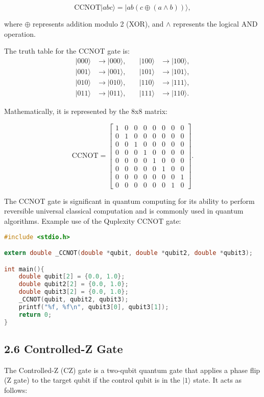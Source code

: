\documentclass{article}
\begin{document}
\[
\text{CCNOT}|abc\rangle = |ab(c \oplus (a \land b))\rangle,
\]

where \(\oplus\) represents addition modulo 2 (XOR), and \(\land\) represents the logical AND operation.

The truth table for the CCNOT gate is:
\[
\begin{aligned}
|000\rangle & \to |000\rangle, \quad & |100\rangle & \to |100\rangle, \\
|001\rangle & \to |001\rangle, \quad & |101\rangle & \to |101\rangle, \\
|010\rangle & \to |010\rangle, \quad & |110\rangle & \to |111\rangle, \\
|011\rangle & \to |011\rangle, \quad & |111\rangle & \to |110\rangle.
\end{aligned}
\]

Mathematically, it is represented by the 8x8 matrix:

\[
\text{CCNOT} = \begin{bmatrix}
1 & 0 & 0 & 0 & 0 & 0 & 0 & 0 \\
0 & 1 & 0 & 0 & 0 & 0 & 0 & 0 \\
0 & 0 & 1 & 0 & 0 & 0 & 0 & 0 \\
0 & 0 & 0 & 1 & 0 & 0 & 0 & 0 \\
0 & 0 & 0 & 0 & 1 & 0 & 0 & 0 \\
0 & 0 & 0 & 0 & 0 & 1 & 0 & 0 \\
0 & 0 & 0 & 0 & 0 & 0 & 0 & 1 \\
0 & 0 & 0 & 0 & 0 & 0 & 1 & 0
\end{bmatrix}.
\]

The CCNOT gate is significant in quantum computing for its ability to perform reversible universal classical computation and is commonly used in quantum algorithms.
Example use of the Quplexity CCNOT gate:

\begin{lstlisting}[language=C, frame=single]
#include <stdio.h>

extern double _CCNOT(double *qubit, double *qubit2, double *qubit3);

int main(){
    double qubit[2] = {0.0, 1.0};
    double qubit2[2] = {0.0, 1.0};
    double qubit3[2] = {0.0, 1.0};
    _CCNOT(qubit, qubit2, qubit3);
    printf("%f, %f\n", qubit3[0], qubit3[1]);
    return 0;
}
\end{lstlisting}

\subsection*{2.6 Controlled-Z Gate}
The Controlled-Z (CZ) gate is a two-qubit quantum gate that applies a phase flip (Z gate) to the target qubit if the control qubit is in the \(|1\rangle\) state. It acts as follows:
\end{document}
